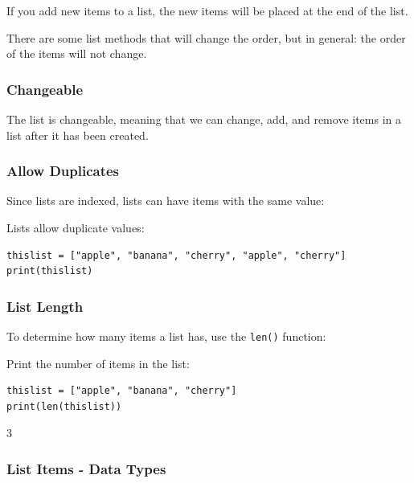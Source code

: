 \documentclass[12pt,a4paper]{article}
\newcommand{\code}[1]{%
	\colorbox{backcolour}{\lstinline{#1}}%
}
\begin{document}
If you add new items to a list, the new items will be placed at the end of the list.

\begin{nbox}
	There are some list methods that will change the order, but in general: the
	order of the items will not change.
\end{nbox}
\subsubsection{Changeable}

The list is changeable, meaning that we can change, add, and remove items in a
list after it has been created.
\subsubsection{Allow Duplicates}

Since lists are indexed, lists can have items with the same value:

\begin{ebox}
Lists allow duplicate values:
	\begin{lstlisting}
thislist = ["apple", "banana", "cherry", "apple", "cherry"]
print(thislist)
	\end{lstlisting}
\tcblower
	\begin{vercode}
	\end{vercode}
\end{ebox}
\subsubsection{List Length}

To determine how many items a list has, use the \code{len()} function:

\begin{ebox}
Print the number of items in the list:
	\begin{lstlisting}
thislist = ["apple", "banana", "cherry"]
print(len(thislist))
	\end{lstlisting}
\tcblower
	\begin{vercode}
3
	\end{vercode}
\end{ebox}
\subsubsection{List Items - Data Types}
\end{document}
